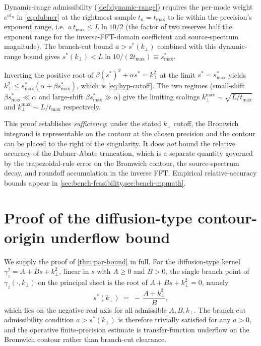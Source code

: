 \documentclass[manuscript,review]{acmart}
\newcommand{\kperp}{k_\perp}
\newcommand{\kpmax}[1][]{k_\perp^{\max#1}}
\newcommand{\gammaz}{\gamma_z}
\begin{document}
Dynamic-range admissibility (\cref{def:dynamic-range}) requires the
per-mode weight $e^{a t_n}$ in \cref{eq:dubner} at the rightmost
sample $t_n = t_{\max}$ to lie within the precision's exponent
range, i.e.\ $a\,t_{\max} \le L \ln 10 / 2$ (the factor of two
reserves half the exponent range for the inverse-FFT-domain
coefficient and source-spectrum magnitude). The branch-cut bound
$a > s^*(\kperp)$ combined with this dynamic-range bound gives
$s^*(\kperp) < L \ln 10 / (2 t_{\max}) \equiv s^*_{\max}$.

Inverting the positive root of $\beta(s^*)^2 + \alpha s^* =
\kperp^2$ at the limit $s^* = s^*_{\max}$ yields
$\kperp^2 \le s^*_{\max}(\alpha + \beta s^*_{\max})$, which is
\cref{eq:hyp-cutoff}. The two regimes (small-shift $\beta s^*_{\max}
\ll \alpha$ and large-shift $\beta s^*_{\max} \gg \alpha$) give the
limiting scalings $\kpmax \sim \sqrt{L/t_{\max}}$ and $\kpmax \sim
L/t_{\max}$ respectively.

This proof establishes \emph{sufficiency}: under the stated $\kperp$
cutoff, the Bromwich integrand is representable on the contour at
the chosen precision and the contour can be placed to the right of
the singularity. It does \emph{not} bound the relative accuracy of
the Dubner-Abate truncation, which is a separate quantity governed
by the trapezoidal-rule error on the Bromwich contour, the
source-spectrum decay, and roundoff accumulation in the inverse
FFT. Empirical relative-accuracy bounds appear in
\cref{sec:bench-feasibility,sec:bench-mpmath}.

\section{Proof of the diffusion-type contour-origin underflow bound}\label{sec:proof-par}

We supply the proof of \cref{thm:par-bound} in full. For the
diffusion-type kernel $\gammaz^2 = A + Bs + \kperp^2$, linear in
$s$ with $A \ge 0$ and $B > 0$, the single branch point of
$\gammaz(\cdot, \kperp)$ on the principal sheet is the root of
$A + Bs + \kperp^2 = 0$, namely
\begin{equation}
s^{*}(\kperp) \;=\; -\,\frac{A + \kperp^2}{B},
\label{eq:par-branch}
\end{equation}
which lies on the negative real axis for all admissible $A, B,
\kperp$. The branch-cut admissibility condition $a > s^*(\kperp)$
is therefore trivially satisfied for any $a > 0$, and the operative
finite-precision estimate is transfer-function underflow on the
Bromwich contour rather than branch-cut clearance.
\end{document}
